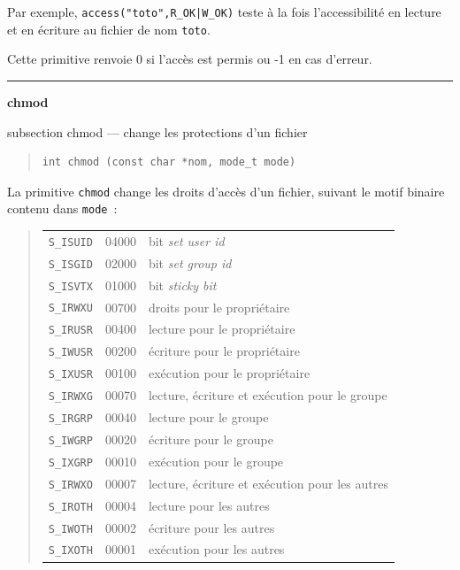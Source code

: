 \documentclass [twoside] {report}
\newcommand {\primitive} [1]
    {
	\phantomsection
	{\large \textbf {#1}}
	\addcontentsline {toc} {subsection} {#1}
    }
\newcommand {\separation}
    {
	\vspace {5mm}
	\nopagebreak
	\hrule
    }
\begin{document}
Par exemple, \verb/access("toto",R_OK|W_OK)/ teste à la fois
l'accessibilité en lecture et en écriture au fichier de nom \texttt {toto}.

Cette primitive renvoie 0 si l'accès est permis
ou -1 en cas d'erreur.




\separation
\primitive {chmod} --- change les protections d'un fichier

\begin {quote}
\begin {verbatim}
int chmod (const char *nom, mode_t mode)
\end{verbatim}
\end {quote}

La primitive \texttt {chmod} change les droits d'accès
d'un fichier, suivant le motif binaire contenu
dans \texttt {mode}~:

\begin {quote}
    \begin {tabular} {|lll|} \hline
	\texttt {S\_ISUID} & 04000 & bit \textit {set user id} \\
	\texttt {S\_ISGID} & 02000 & bit \textit {set group id} \\
	\texttt {S\_ISVTX} & 01000 & bit \textit {sticky bit} \\
	\texttt {S\_IRWXU} & 00700 & droits pour le propriétaire \\
	\texttt {S\_IRUSR} & 00400 & lecture pour le propriétaire \\
	\texttt {S\_IWUSR} & 00200 & écriture pour le propriétaire \\
	\texttt {S\_IXUSR} & 00100 & exécution pour le propriétaire \\
	\texttt {S\_IRWXG} & 00070 & lecture, écriture et exécution pour le groupe \\
	\texttt {S\_IRGRP} & 00040 & lecture pour le groupe \\
	\texttt {S\_IWGRP} & 00020 & écriture pour le groupe \\
	\texttt {S\_IXGRP} & 00010 & exécution pour le groupe \\
	\texttt {S\_IRWXO} & 00007 & lecture, écriture et exécution pour les autres \\
	\texttt {S\_IROTH} & 00004 & lecture pour les autres \\
	\texttt {S\_IWOTH} & 00002 & écriture pour les autres \\
	\texttt {S\_IXOTH} & 00001 & exécution pour les autres \\ \hline
    \end {tabular}
\end {quote}
\end{document}
